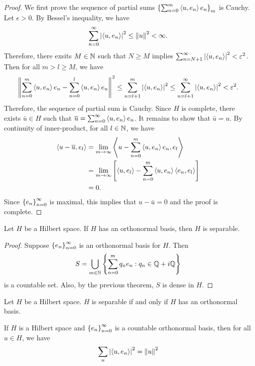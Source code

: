 \documentclass[a4paper]{article}
\begin{document}
\begin{proof}
We first prove the sequence of partial sums 
$\left\{ \sum_{n=0}^m \left\langle u, e_n \right\rangle e_n \right\}_m$
is Cauchy. Let $\epsilon > 0$. By Bessel's inequality, 
we have 
\[
\sum_{n=0}^\infty \left\lvert \left\langle u, e_n \right\rangle\right\rvert^2 \leq \left\lVert u\right\rVert^2 < \infty.
\]
Therefore, there exsits $M \in \mathbb{N}$ such that 
$N \geq M$ implies $\sum_{n=N+1}^\infty \left\lvert \left\langle u, e_n \right\rangle\right\rvert^2 
< \varepsilon^2$. Then for all $m > l \geq M$, we have 
\[
\left\lVert \sum_{n=0}^m \left\langle u, e_n \right\rangle e_n - 
\sum_{n=0}^l \left\langle u, e_n \right\rangle e_n\right\rVert^2 
\leq \sum_{n=l+1}^m \left\lvert \left\langle u, e_n \right\rangle\right\rvert^2 
\leq \sum_{n=l+1}^\infty \left\lvert \left\langle u, e_n \right\rangle\right\rvert^2 
< \varepsilon^2.
\]
Therefore, the sequence of partial sum is Cauchy.
Since $H$ is complete, there exists $\bar{u} \in H$
such that $\overline{u} = \sum_{n=0}^\infty \left\langle u, e_n \right\rangle e_n$. 
It remains to show that $\bar{u} = u$. 
By continuity of inner-product, for all $l \in \mathbb{N}$, we 
have 
\[
\begin{aligned}
  \left\langle u - \overline{u}, e_l \right\rangle 
  &= \lim_{m \to \infty} \left\langle u - \sum_{n=0}^m 
  \left\langle u, e_n \right\rangle e_n, e_l \right\rangle  \\
  &= \lim_{m \to \infty} \left[ \left\langle u, e_l \right\rangle 
  - \sum_{n=0}^m \left\langle u, e_n \right\rangle \left\langle e_n, e_l \right\rangle \right] \\
  &= 0.
\end{aligned}
\]
Since $\left\{ e_n \right\}_{n=0}^\infty$ is maximal, this implies that 
$u - \bar{u} = 0$ and the proof is complete.
\end{proof}

\begin{thm}
Let $H$ be a Hilbert space.
If $H$ has an orthonormal basis, then 
$H$ is separable.
\end{thm}

\begin{proof}
Suppose $\left\{ e_n \right\}_{n=0}^\infty$ is an orthonormal basis for $H$. 
Then 
\[
S = \bigcup_{m \in \mathbb{N}} \left\{ \sum_{n=0}^m q_n e_n : 
q_n \in \mathbb{Q} + i \mathbb{Q} \right\}
\]
is a countable set. 
Also, by the previous theorem, $S$ is dense in $H$.
\end{proof}

\begin{remark}
Let $H$ be a Hilbert space. $H$ is separable if and only if 
$H$ has an orthonormal basis.
\end{remark}

\begin{thm}
If $H$ is a Hilbert space and $\left\{ e_n \right\}_{n=0}^\infty$ is a
countable orthonormal basis, then for all $u \in H$, 
we have 
\[
\sum_n \left\lvert \left\langle u, e_n \right\rangle\right\rvert^2 = \left\lVert u\right\rVert^2
\]
\end{thm}
\end{document}
